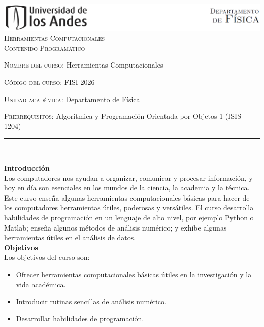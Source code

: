 \documentclass[letterpaper,10pt,onecolumn]{article}
\begin{document}
\begin{center}

\includegraphics[width=490pt]{header.png}\\[0.5cm]

\textsc{\huge Herramientas Computacionales}\\[0.1cm]

\Large \textsc{Contenido Programático}\\[0.7cm]

\end{center}

\large \noindent\textsc{Nombre del curso:} Herramientas Computacionales
	 
\noindent\textsc{Código del curso:} FISI 2026

\noindent\textsc{Unidad académica:} Departamento de Física

\noindent\textsc{Prerrequisitos:} Algorítmica y Programación Orientada por Objetos 1 (ISIS 1204)

\noindent\rule{\textwidth}{1pt}\\[-0.1cm]

\addtocounter{mysection}{1}

\noindent\textbf{\large {} \quad Introducción}\\[-0.2cm]

\noindent\normalsize Los computadores nos ayudan a organizar, comunicar y procesar información, y hoy en día son esenciales en los mundos de la ciencia, la academia y la técnica. Este curso enseña algunas herramientas computacionales básicas para hacer de los computadores herramientas útiles, poderosas y versátiles. El curso desarrolla habilidades de programación en un lenguaje de alto nivel, por ejemplo Python o Matlab; enseña algunos métodos de análisis numérico; y exhibe algunas herramientas útiles en el análisis de datos. \\[0.1cm]

\noindent\textbf{\large {} \quad Objetivos}\\[-0.2cm]

\noindent\normalsize Los objetivos del curso son:

\begin{itemize}
	\item Ofrecer herramientas computacionales básicas útiles en la investigación y la vida académica.\\[-0.6cm]
	\item Introducir rutinas sencillas de análisis numérico.\\[-0.6cm]
	\item Desarrollar habilidades de programación.\\[-0.2cm]
\end{itemize}
\end{document}
